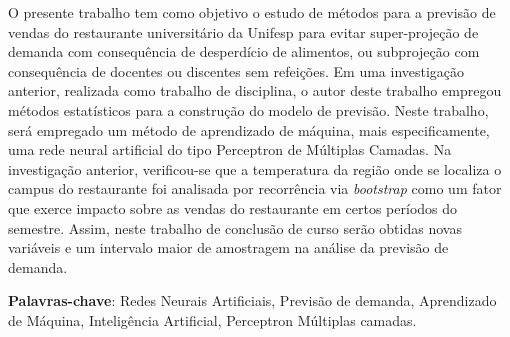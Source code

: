 \documentclass[	12pt, Times, openright, twoside, a4paper, english, brazil]{abntex2}
\begin{document}

    \begin{resumo}
         O presente trabalho tem como objetivo o estudo de métodos para a previsão de vendas do restaurante universitário da Unifesp para evitar super-projeção de demanda com consequência de desperdício de alimentos, ou subprojeção com consequência de docentes ou discentes sem refeições.
         Em uma investigação anterior, realizada como trabalho de disciplina, o autor deste trabalho empregou métodos estatísticos para a construção do modelo de previsão. Neste trabalho, será empregado um método de aprendizado de máquina, mais especificamente, uma rede neural artificial do tipo Perceptron de Múltiplas Camadas. Na investigação anterior, verificou-se que a temperatura da região onde se localiza o campus do restaurante foi analisada por recorrência via \textit{bootstrap} como um fator que exerce impacto sobre as vendas do restaurante em certos períodos do semestre. Assim,  neste trabalho de conclusão de curso serão obtidas novas variáveis e um intervalo maior de amostragem na análise da previsão de demanda.
 
     
     \vspace{\onelineskip}
        
     \noindent
     \textbf{Palavras-chave}: Redes Neurais Artificiais, Previsão de demanda, Aprendizado de Máquina, Inteligência Artificial, Perceptron Múltiplas camadas. 
     
    \end{resumo}
\end{document}
